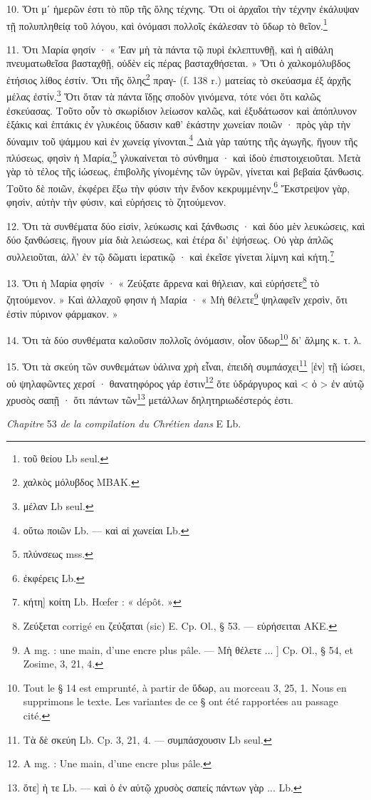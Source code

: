 \documentclass[landscape, a4paper, 11pt, oneside, polutonikogreek, french]{article}
\begin{document}
10. Ὅτι μʹ ἡμερῶν ἐστι τὸ πῦρ τῆς ὅλης τέχνης. Ὅτι οἱ ἀρχαῖοι τὴν τέχνην ἐκάλυψαν τῇ πολυπληθείᾳ τοῦ λόγου, καὶ ὀνόμασι πολλοῖς ἐκάλεσαν τὸ ὕδωρ τὸ θεῖον.\footnote{τοῦ θείου Lb seul.}

11. Ὅτι Μαρία φησίν · « Ἐαν μὴ τὰ πάντα τῷ πυρὶ ἐκλεπτυνθῇ, καὶ ἡ αἰθάλη πνευματωθεῖσα βασταχθῇ, οὐδὲν εἰς πέρας βασταχθήσεται. » Ὅτι ὁ χαλκομόλυβδος ἐτήσιος λίθος ἐστίν. Ὅτι τῆς ὅλης\footnote{χαλκὸς μόλυβδος MBAK.} πραγ- (f. 138 r.) ματείας τὸ σκεύασμα ἐξ ἀρχῆς μέλας ἐστίν.\footnote{μέλαν Lb seul.} Ὅτι ὅταν τὰ πάντα ἴδῃς σποδὸν γινόμενα, τότε νόει ὅτι καλῶς ἐσκεύασας. Τοῦτο οὖν τὸ σκωρίδιον λείωσον καλῶς, καὶ ἐξυδάτωσον καὶ ἀπόπλυνον ἑξάκις καὶ ἑπτάκις ἐν γλυκέοις ὕδασιν καθ' ἑκάστην χωνείαν ποιῶν · πρὸς γὰρ τὴν δύναμιν τοῦ ψάμμου καὶ ἐν χωνείᾳ γίνονται.\footnote{οὕτω ποιῶν Lb. --- καὶ αἱ χωνείαι Lb.} Διὰ γὰρ ταύτης τῆς ἀγωγῆς, ἤγουν τῆς πλύσεως, φησὶν ἡ Μαρία,\footnote{πλύνσεως mss.} γλυκαίνεται τὸ σύνθημα · καὶ ἰδοὺ ἐπιστοιχειοῦται. Μετὰ γὰρ τὸ τέλος τῆς ἰώσεως, ἐπιβολῆς γίνομένης τῶν ὑγρῶν, γίνεται καὶ βεβαία ξάνθωσις. Τοῦτο δὲ ποιῶν, ἐκφέρει ἔξω τὴν φύσιν τὴν ἔνδον κεκρυμμένην.\footnote{ἐκφέρεις Lb.} Ἔκστρεψον γὰρ, φησὶν, αὐτὴν τὴν φύσιν, καὶ εὑρήσεις τὸ ζητούμενον.

12. Ὅτι τὰ συνθέματα δύο εἰσὶν, λεύκωσις καὶ ξάνθωσις · καὶ δύο μὲν λευκώσεις, καὶ δύο ξανθώσεις, ἤγουν μία διὰ λειώσεως, καὶ ἑτέρα δι' ἑψήσεως. Οὐ γὰρ ἁπλῶς συλλειοῦται, ἀλλ' ἐν τῷ δῶματι ἱερατικῷ · καὶ ἐκεῖσε γίνεται λίμνη καὶ κήτη.\footnote{κήτη] κοίτη Lb. Hœfer : « dépôt. »}

13. Ὅτι ἡ Μαρία φησίν · « Ζεύξατε ἄρρενα καὶ θήλειαν, καὶ εὑρήσετε\footnote{Ζεύξεται corrigé en ζεύξαται (sic) E. Cp. Ol., § 53. --- εὑρήσειται AKE.} τὸ ζητούμενον. » Καὶ ἀλλαχοῦ φησιν ἡ Μαρία · « Μὴ θέλετε\footnote{A mg. : une main, d'une encre plus pâle. --- Μὴ θέλετε ... ] Cp. Ol., § 54, et Zosime, 3, 21, 4.} ψηλαφεῖν χερσὶν, ὅτι ἐστὶν πύρινον φάρμακον. »

14. Ὅτι τὰ δύο συνθέματα καλοῦσιν πολλοῖς ὀνόμασιν, οἷον ὕδωρ\footnote{Tout le § 14 est emprunté, à partir de ὕδωρ, au morceau 3, 25, 1. Nous en supprimons le texte. Les variantes de ce § ont été rapportées au passage cité.} δι' ἅλμης κ. τ. λ.

15. Ὅτι τὰ σκεύη τῶν συνθεμάτων ὑάλινα χρὴ εἶναι, ἐπειδὴ συμπάσχει\footnote{Τὰ δὲ σκεύη Lb. Cp. 3, 21, 4. --- συμπάσχουσιν Lb seul.} [ἐν] τῇ ἰώσει, οὐ ψηλαφῶντες χερσί · θανατηφόρος γάρ ἐστιν\footnote{A mg. : Une main, d'une encre plus pâle.} ὅτε ὑδράργυρος καὶ < ὁ > ἐν αὐτῷ χρυσὸς σαπῇ · ὅτι πάντων τῶν\footnote{ὅτε] ἡ τε Lb. --- καὶ ὁ ἐν αὐτῷ χρυσὸς σαπείς πάντων γὰρ ... Lb.} μετάλλων δηλητηριωδέστερός ἐστι.
\begin{center}
\emph{Chapitre} 53 \emph{de la compilation du Chrétien dans} E Lb.
\end{center}
\end{document}
